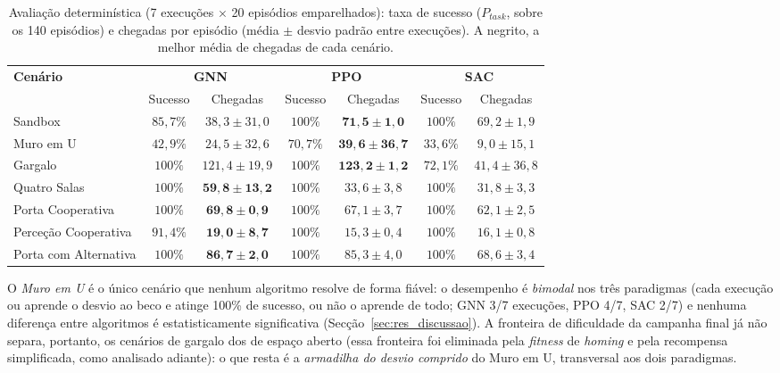 \documentclass[12pt,reqno, twoside]{amsbook}
\theoremstyle{plain}
\numberwithin{equation}{chapter}
\numberwithin{section}{chapter}
\numberwithin{table}{chapter}
\numberwithin{figure}{chapter}
\begin{document}
\begin{table}[!htbp]
\centering
\footnotesize
\caption[Avaliação determinística nos sete cenários]{Avaliação determinística (7 execuções $\times$ 20 episódios emparelhados): taxa de sucesso ($P_{task}$, sobre os 140 episódios) e chegadas por episódio (média $\pm$ desvio padrão entre execuções). A negrito, a melhor média de chegadas de cada cenário.}
\label{tab:res_eval}
\renewcommand{\arraystretch}{1.3}
\begin{tabular}{|l|c|c|c|c|c|c|}
\hline
\textbf{Cenário} & \multicolumn{2}{c|}{\textbf{GNN}} & \multicolumn{2}{c|}{\textbf{PPO}} & \multicolumn{2}{c|}{\textbf{SAC}} \\ \cline{2-7}
 & Sucesso & Chegadas & Sucesso & Chegadas & Sucesso & Chegadas \\ \hline
Sandbox & $85{,}7\%$ & $38{,}3 \pm 31{,}0$ & $100\%$ & $\mathbf{71{,}5 \pm 1{,}0}$ & $100\%$ & $69{,}2 \pm 1{,}9$ \\ \hline
Muro em U & $42{,}9\%$ & $24{,}5 \pm 32{,}6$ & $70{,}7\%$ & $\mathbf{39{,}6 \pm 36{,}7}$ & $33{,}6\%$ & $9{,}0 \pm 15{,}1$ \\ \hline
Gargalo & $100\%$ & $121{,}4 \pm 19{,}9$ & $100\%$ & $\mathbf{123{,}2 \pm 1{,}2}$ & $72{,}1\%$ & $41{,}4 \pm 36{,}8$ \\ \hline
Quatro Salas & $100\%$ & $\mathbf{59{,}8 \pm 13{,}2}$ & $100\%$ & $33{,}6 \pm 3{,}8$ & $100\%$ & $31{,}8 \pm 3{,}3$ \\ \hline
Porta Cooperativa & $100\%$ & $\mathbf{69{,}8 \pm 0{,}9}$ & $100\%$ & $67{,}1 \pm 3{,}7$ & $100\%$ & $62{,}1 \pm 2{,}5$ \\ \hline
Perceção Cooperativa & $91{,}4\%$ & $\mathbf{19{,}0 \pm 8{,}7}$ & $100\%$ & $15{,}3 \pm 0{,}4$ & $100\%$ & $16{,}1 \pm 0{,}8$ \\ \hline
Porta com Alternativa & $100\%$ & $\mathbf{86{,}7 \pm 2{,}0}$ & $100\%$ & $85{,}3 \pm 4{,}0$ & $100\%$ & $68{,}6 \pm 3{,}4$ \\ \hline
\end{tabular}
\end{table}


O \emph{Muro em U} é o único cenário que nenhum algoritmo resolve de forma fiável: o desempenho é \emph{bimodal} nos três paradigmas (cada execução ou aprende o desvio ao beco e atinge 100\% de sucesso, ou não o aprende de todo; GNN 3/7 execuções, PPO 4/7, SAC 2/7) e nenhuma diferença entre algoritmos é estatisticamente significativa (Secção~\ref{sec:res_discussao}). A fronteira de dificuldade da campanha final já não separa, portanto, os cenários de gargalo dos de espaço aberto (essa fronteira foi eliminada pela \textit{fitness} de \textit{homing} e pela recompensa simplificada, como analisado adiante): o que resta é a \emph{armadilha do desvio comprido} do Muro em U, transversal aos dois paradigmas.
\end{document}
